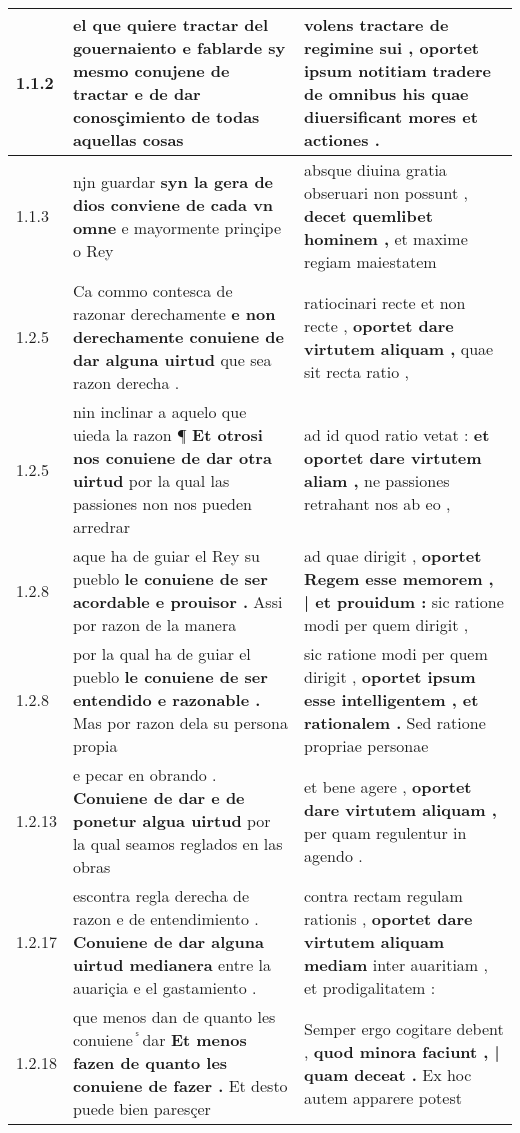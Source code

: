 \begin{tabular}{|p{1cm}|p{6.5cm}|p{6.5cm}|}

\hline
1.1.2 & el que quiere tractar del gouernaiento \textbf{ e fablarde sy mesmo conujene de tractar } e de dar conosçimiento de todas aquellas cosas & volens tractare de regimine sui , \textbf{ oportet ipsum notitiam tradere de omnibus his } quae diuersificant mores et actiones . \\\hline
1.1.3 & njn guardar \textbf{ syn la gera de dios conviene de cada vn omne } e mayormente prinçipe o Rey & absque diuina gratia obseruari non possunt , \textbf{ decet quemlibet hominem , } et maxime regiam maiestatem \\\hline
1.2.5 & Ca commo contesca de razonar derechamente \textbf{ e non derechamente conuiene de dar alguna uirtud } que sea razon derecha . & ratiocinari recte et non recte , \textbf{ oportet dare virtutem aliquam , } quae sit recta ratio , \\\hline
1.2.5 & nin inclinar a aquelo que uieda la razon ¶ \textbf{ Et otrosi nos conuiene de dar otra uirtud } por la qual las passiones non nos pueden arredrar & ad id quod ratio vetat : \textbf{ et oportet dare virtutem aliam , } ne passiones retrahant nos ab eo , \\\hline
1.2.8 & aque ha de guiar el Rey su pueblo \textbf{ le conuiene de ser acordable e prouisor . } Assi por razon de la manera & ad quae dirigit , \textbf{ oportet Regem esse memorem , | et prouidum : } sic ratione modi per quem dirigit , \\\hline
1.2.8 & por la qual ha de guiar el pueblo \textbf{ le conuiene de ser entendido e razonable . } Mas por razon dela su persona propia & sic ratione modi per quem dirigit , \textbf{ oportet ipsum esse intelligentem , et rationalem . } Sed ratione propriae personae \\\hline
1.2.13 & e pecar en obrando . \textbf{ Conuiene de dar e de ponetur algua uirtud } por la qual seamos reglados en las obras & et bene agere , \textbf{ oportet dare virtutem aliquam , } per quam regulentur in agendo . \\\hline
1.2.17 & escontra regla derecha de razon e de entendimiento . \textbf{ Conuiene de dar alguna uirtud medianera } entre la auariçia e el gastamiento . & contra rectam regulam rationis , \textbf{ oportet dare virtutem aliquam mediam } inter auaritiam , et prodigalitatem : \\\hline
1.2.18 & que menos dan de quanto les conuiene ᷤ dar \textbf{ Et menos fazen de quanto les conuiene de fazer . } Et desto puede bien paresçer & Semper ergo cogitare debent , \textbf{ quod minora faciunt , | quam deceat . } Ex hoc autem apparere potest \\\hline

\end{tabular}
